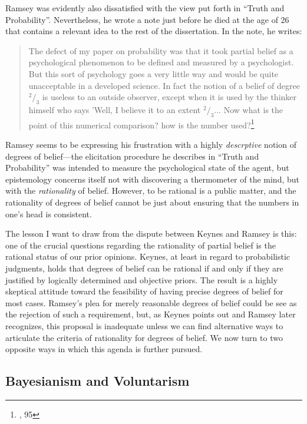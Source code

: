 Ramsey was evidently also dissatisfied with the view put forth in ``Truth and Probability''. Nevertheless, he wrote a note just before he died at the age of 26 that contains a relevant idea to the rest of the dissertation. In the note, he writes:

\begin{quote}
The defect of my paper on probability was that it took partial belief as a psychological phenomenon to be defined and measured by a psychologist. But this sort of psychology goes a very little way and would be quite unacceptable in a developed science. In fact the notion of a belief of degree $^2/_3$ is useless to an outside observer, except when it is used by the thinker himself who says 'Well, I believe it to an extent $^2/_3$... Now what is the point of this numerical comparison? how is the number used?\footnote{\cite{ramsey}, 95}
\end{quote}

Ramsey seems to be expressing his frustration with a highly \emph{descrptive} notion of degrees of belief---the elicitation procedure he describes in ``Truth and Probability'' was intended to measure the psychological state of the agent, but epistemology concerns itself not with discovering a thermometer of the mind, but with the \emph{rationality} of belief. However, to be rational is a public matter, and the rationality of degrees of belief cannot be just about ensuring that the numbers in one's head is consistent. 

The lesson I want to draw from the dispute between Keynes and Ramsey is
this: one of the crucial questions regarding the rationality of partial
belief is the rational status of our prior opinions. Keynes, at least in
regard to probabilistic judgments, holds that degrees of belief can be
rational if and only if they are justified by logically
determined and objective priors. The result is a highly skeptical
attitude toward the feasibility of having precise degrees of belief for
most cases. Ramsey's plea for merely reasonable degrees of belief could
be see as the rejection of such a requirement, but, as Keynes points out and Ramsey later recognizes,
this proposal is inadequate unless we can find alternative ways to
articulate the criteria of rationality for degrees of belief. We now turn to two opposite ways in which this agenda is further pursued.



\hypertarget{bayesianism-and-voluntarism}{%
\subsection{Bayesianism and
Voluntarism}\label{sec:bayesianism-and-voluntarism}}


